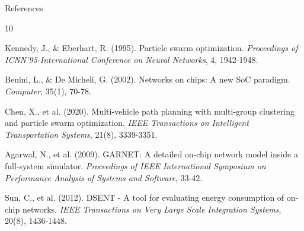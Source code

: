 \documentclass[10pt]{beamer}
\begin{document}
\begin{frame}{Future Research Directions}
\begin{frame}{Research Impact and Significance}
\begin{alertblock}{Long-term Vision}
\begin{frame}{Final Remarks}
\begin{center}
        \vspace{0.5cm}
        
        \textit{Questions and Discussion Welcome}
    \end{center>
\end{frame}

\begin{frame}{References}
    \begin{thebibliography}{10}
        \beamertemplatearticlebibitems
        
        Kennedy, J., \& Eberhart, R. (1995). 
        \newblock Particle swarm optimization.
        \newblock \emph{Proceedings of ICNN'95-International Conference on Neural Networks}, 4, 1942-1948.
        
        Benini, L., \& De Micheli, G. (2002).
        \newblock Networks on chips: A new SoC paradigm.
        \newblock \emph{Computer}, 35(1), 70-78.
        
        Chen, X., et al. (2020).
        \newblock Multi-vehicle path planning with multi-group clustering and particle swarm optimization.
        \newblock \emph{IEEE Transactions on Intelligent Transportation Systems}, 21(8), 3339-3351.
        
        Agarwal, N., et al. (2009).
        \newblock GARNET: A detailed on-chip network model inside a full-system simulator.
        \newblock \emph{Proceedings of IEEE International Symposium on Performance Analysis of Systems and Software}, 33-42.
        
        Sun, C., et al. (2012).
        \newblock DSENT - A tool for evaluating energy consumption of on-chip networks.
        \newblock \emph{IEEE Transactions on Very Large Scale Integration Systems}, 20(8), 1436-1448.
    \end{thebibliography}
\end{frame}
\end{document}
